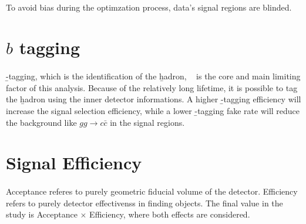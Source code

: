 \paragraph{}
To avoid bias during the optimzation process, data's signal regions are blinded.


\section{$b$ tagging}
\paragraph{}
\b-tagging, which is the identification of the \b hadron,  ~\cite{Reco-btag-2016} is the core and main limiting factor of this analysis. Because of the relatively long lifetime, it is possible to tag the \b hadron using the inner detector informations. A higher \b-tagging efficiency will increase the signal selection efficiency, while a lower \b-tagging fake rate will reduce the background like $gg \to c\bar{c}$ in the signal regions.


\section{Signal Efficiency}
\paragraph{}
Acceptance referes to purely geometric fiducial volume of the detector. Efficiency refers to purely detector effectivenss in finding objects. The final value in the study is Acceptance $\times$ Efficiency, where both effects are considered.


